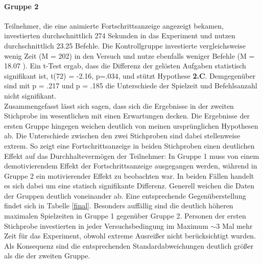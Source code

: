 \paragraph{Gruppe 2}
Teilnehmer, die eine animierte Fortschrittsanzeige angezeigt bekamen, investierten durchschnittlich 274 Sekunden in das Experiment und nutzen durchschnittlich 23.25 Befehle. Die Kontrollgruppe investierte vergleichsweise wenig Zeit (M = 202) in den Versuch und nutze ebenfalls weniger Befehle (M = 18.07 ). Ein t-Test ergab, dass die Differenz der gelösten Aufgaben statistisch signifikant ist, t(72) = -2.16, p=.034, und stützt Hypothese \textbf{2.C}. Demgegenüber sind mit p = .217 und p = .185 die Unterschiede der Spielzeit und Befehlsanzahl nicht signifikant.\\
 
Zusammengefasst lässt sich sagen, dass sich die Ergebnisse in der zweiten Stichprobe im wesentlichen mit einen Erwartungen decken. Die Ergebnisse der ersten Gruppe hingegen weichen deutlich von meinen ursprünglichen Hypothesen ab. Die Unterschiede zwischen den zwei Stichproben sind dabei stellenweise extrem. So zeigt eine Fortschrittsanzeige in beiden Stichproben einen deutlichen Effekt auf das Durchhaltevermögen der Teilnehmer: In Gruppe 1 muss von einem demotivierendem Effekt der Fortschrittsanzeige ausgegangen werden, während in Gruppe 2 ein motivierender Effekt zu beobachten war. In beiden Fällen handelt es sich dabei um eine statisch signifikante Differenz. Generell weichen die Daten der Gruppen deutlich voneinander ab. Eine entsprechende Gegenüberstellung findet sich in Tabelle \ref{final}. Besonders auffällig sind die deutlich höheren maximalen Spielzeiten in Gruppe 1 gegenüber Gruppe 2. Personen der ersten Stichprobe investierten in jeder Versuchsbedingung im Maximum $\sim3$ Mal mehr Zeit für das Experiment, obwohl extreme Ausreißer nicht berücksichtigt wurden. Als Konsequenz sind die entsprechenden Standardabweichungen deutlich größer als die der zweiten Gruppe.


